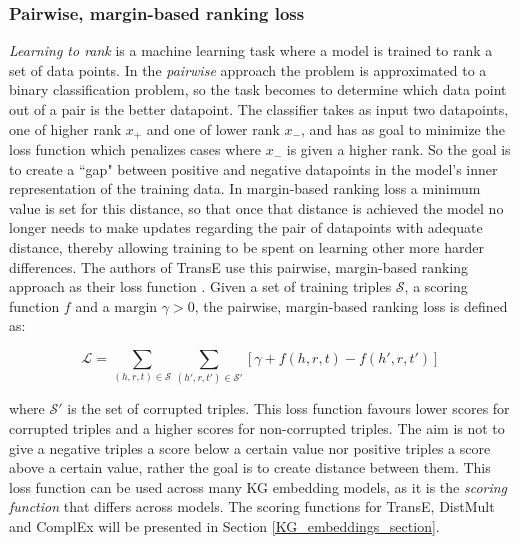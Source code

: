 \subsubsection{Pairwise, margin-based ranking loss}
\textit{Learning to rank} is a machine learning task where a model is trained to rank a set of data points. In the \textit{pairwise} approach the problem is approximated to a binary classification problem, so the task becomes to determine which data point out of a pair is the better datapoint. The classifier takes as input two datapoints, one of higher rank $x_{+}$ and one of lower rank $x_{-}$, and has as goal to minimize the loss function which penalizes cases where $x_{-}$ is given a higher rank. So the goal is to create a ``gap" between positive and negative datapoints in the model's inner representation of the training data. In margin-based ranking loss a minimum value is set for this distance, so that once that distance is achieved the model no longer needs to make updates regarding the pair of datapoints with adequate distance, thereby allowing training to be spent on learning other more harder differences.  The authors of TransE use this pairwise, margin-based ranking approach as their loss function \cite{TransE}. Given a set of training triples $\mathcal{S}$, a scoring function $f$ and a margin $\gamma > 0$, the pairwise, margin-based ranking loss is defined as:

\[\mathcal{L}=\sum_{(h, r, t) \in \mathcal{S}}\sum_{(h', r, t') \in \mathcal{S'}}[\gamma + f(h, r, t) - f(h', r, t')]\]

where $\mathcal{S'}$ is the set of corrupted triples. This loss function favours lower scores for corrupted triples and a higher scores for non-corrupted triples. The aim is not to give a negative triples a score below a certain value nor positive triples a score above a certain value, rather the goal is to create distance between them. This loss function can be used across many KG embedding models, as it is the \textit{scoring function} that differs across models. The scoring functions for TransE, DistMult and ComplEx will be presented in Section \ref{KG_embeddings_section}.


